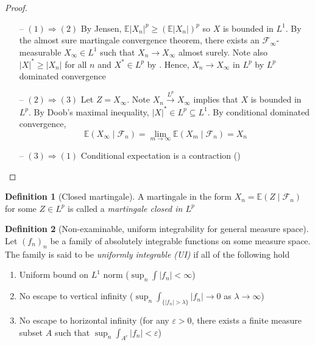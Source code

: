 \documentclass[parskip=full]{article}
\theoremstyle{definition}
\newtheorem*{definition}{Definition}
\newcommand{\1}{\mathbbm{1}}
\newcommand{\E}{\mathbb{E}}
\begin{document}
\begin{proof}
  \begin{itemize}
    \item [--] $(1) \Rightarrow (2)$ By Jensen, $\E |X_n|^p \geq (\E |X_n| )^p$ so $X$ is bounded in $L^1$. By the almost sure martingale convergence theorem, there exists an $\mathcal{F}_\infty$-measurable $X_\infty \in L^1$ such that $X_n \to X_\infty$ almost surely. Note also $|X|^* \geq |X_n|$ for all $n$ and $X^* \in L^p$ by . Hence, $X_n \to X_\infty$ in $L^p$ by $L^p$ dominated convergence

    \item [--] $(2) \Rightarrow (3)$ Let $Z = X_\infty$. Note $X_n \xrightarrow{L^p} X_\infty$ implies that $X$ is bounded in $L^p$. By Doob's maximal inequality, $|X|^* \in L^p \subseteq L^1$. By conditional dominated convergence, 
    \[
      \E (X_\infty \mid \mathcal{F}_n) = \lim_{m \to \infty} \E (X_m \mid \mathcal{F}_n) = X_n 
    \]

    \item [--] $(3) \Rightarrow (1)$ Conditional expectation is a contraction ()
  \end{itemize}
\end{proof}

\begin{definition}[Closed martingale]
  A martingale in the form $X_n = \E (Z \mid \mathcal{F}_n)$ for some $Z \in L^p$ is called a \emph{martingale closed in $L^p$}
\end{definition}

\begin{definition}[Non-examinable, uniform integrability for general measure space]
  Let $(f_n)_n$ be a family of absolutely integrable functions on some measure space. The family is said to be \emph{uniformly integrable (UI)} if all of the following hold
  \begin{enumerate}
    \item Uniform bound on $L^1$ norm ($\sup_n \int |f_n| < \infty$)
    \item No escape to vertical infinity ($\sup_n \int_{\{|f_n| > \lambda\}} |f_n| \to 0$ as $\lambda \to \infty$)
    \item No escape to horizontal infinity (for any $\varepsilon > 0$, there exists a finite measure subset $A$ such that $\sup_n \int_{A^c} |f_n| < \varepsilon$)
  \end{enumerate}
\end{definition}
\end{document}
